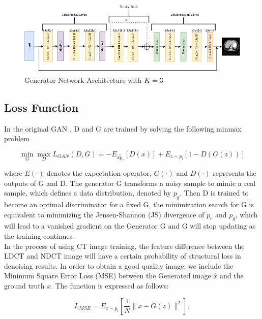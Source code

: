 \documentclass[journal]{IEEEtran}
\begin{document}
\begin{figure}[t!]
    \centering
    \includegraphics[width=15cm]{generator}
    \caption{Generator Network Architecture with $K=3$}
    \label{generator}
\end{figure}	
	
\subsection{Loss Function}
\label{loss function}
In the original GAN \cite{goodfellow2014generative}, D and G are trained by solving the following minmax problem

\begin{equation}
	\mathop{min}_{G}\mathop{max}_{D} L_{GAN}(D,G) = -E_{x \tilde p_r}[D(x)] + E_{z \sim p_l}[1-D(G(z))]
\end{equation}

where $E(\cdot)$ denotes the expectation operator, $G(\cdot)$ and $D(\cdot)$ represents the outputs of G and D.  The generator G transforms a noisy sample to mimic a real sample, which defines a data distribution, denoted by $p_g$.  Then D is trained to become an optimal discriminator for a fixed G, the minimization search for G is equivalent to minimizing the Jensen-Shannon (JS) divergence of $p_r$ and $p_g$, which will lead to a vanished gradient on the Generator G  \cite{8340157} and G will stop updating as the training continues.  \\
	In the process of using CT image training, the feature difference between the LDCT and NDCT image will have a certain probability of structural loss in denoising results.  In order to obtain a good quality image, we include the Minimum Square Error Loss (MSE) between the Generated image $\hat{x}$ and the ground truth $x$.  The function is expressed as follows:
	
\begin{equation}
	L_{MSE} = E_{z\sim p_l}\left[ \frac{1}{N}\|x - G(z)\|^2 \right],
\end{equation}
	
\end{document}
